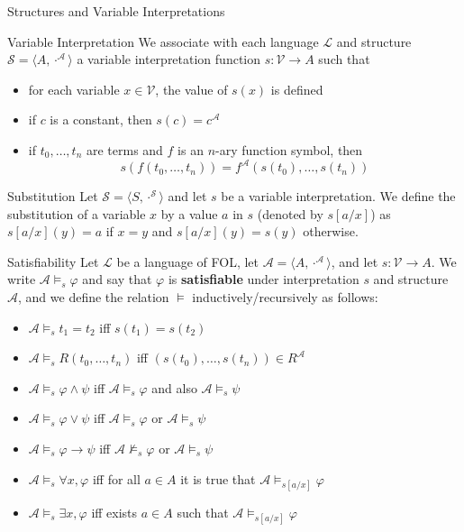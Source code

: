 \documentclass[aspectratio=169]{beamer}
\begin{document}
\begin{slide}{Structures and Variable Interpretations}
\begin{block}{Variable Interpretation}
We associate with each language $\mathcal{L}$ and structure $\mathcal{S} = \langle A, \cdot^\mathcal{A} \rangle$ a variable interpretation function $s : \mathcal{V} \to A$ such that
\begin{itemize}
  \item for each variable $x \in \mathcal{V}$, the value of $s(x)$ is defined
  \item if $c$ is a constant, then $s(c) = c^\mathcal{A}$
  \item if $t_0,\ldots,t_n$ are terms and $f$ is an $n$-ary function symbol, then 
  $$s(f(t_0,\ldots,t_n)) = f^\mathcal{A}(s(t_0),\ldots,s(t_n))$$
\end{itemize}
\end{block}
\begin{block}{Substitution}
Let $\mathcal{S} = \langle S, \cdot^\mathcal{S} \rangle$ and let $s$ be a variable interpretation. We define the substitution of a variable $x$ by a value $a$ in $s$ (denoted by $s[a/x]$) as $s[a/x](y) = a$ if $x = y$ and $s[a/x](y) = s(y)$ otherwise.
\end{block}


\end{slide}

\begin{slide}{Satisfiability}
Let $\mathcal{L}$ be a language of FOL, let $\mathcal{A} = \langle A, \cdot^\mathcal{A} \rangle$, and let $s : \mathcal{V} \to A$. We write $\mathcal{A} \models_s \varphi$ and say that $\varphi$ is \textbf{satisfiable} under interpretation $s$ and structure $\mathcal{A}$, and we define the relation $\models$ inductively/recursively as follows:
\begin{itemize}
  \item $\mathcal{A} \models_s t_1 = t_2$ iff $s(t_1) = s(t_2)$
  \item $\mathcal{A} \models_s R(t_0,\ldots,t_n)$ iff $(s(t_0),\ldots,s(t_n)) \in R^\mathcal{A}$
  \item $\mathcal{A} \models_s \varphi \land \psi$ iff $\mathcal{A} \models_s \varphi$ and also $\mathcal{A} \models_s \psi$
  \item $\mathcal{A} \models_s \varphi \lor \psi$ iff $\mathcal{A} \models_s \varphi$ or $\mathcal{A} \models_s \psi$
  \item $\mathcal{A} \models_s \varphi \to \psi $ iff $\mathcal{A} \not\models_s \varphi$ or $\mathcal{A} \models_s \psi$
  \item $\mathcal{A} \models_s \forall x, \varphi$ iff for all $a \in A$ it is true that $\mathcal{A} \models_{s[a/x]} \varphi$
  \item $\mathcal{A} \models_s \exists x, \varphi$ iff exists $a \in A$ such that $\mathcal{A} \models_{s[a/x]} \varphi$
\end{itemize}
\end{slide}
\end{document}
